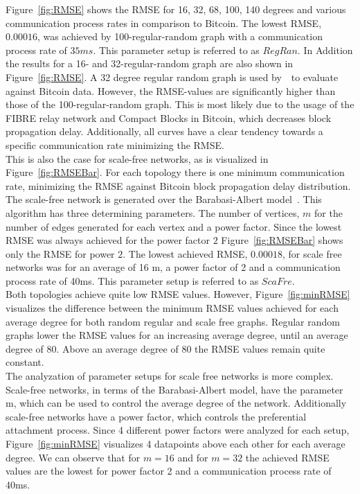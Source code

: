 Figure~\ref{fig:RMSE} shows the RMSE for 16, 32, 68, 100, 140 degrees and various communication process rates in comparison to Bitcoin. The lowest RMSE, $0.00016$, was achieved by 100-regular-random graph with a communication process rate of $35ms$. This parameter setup is referred to as $RegRan$. 
In Addition the results for a 16- and 32-regular-random graph are also shown in Figure~\ref{fig:RMSE}. A 32 degree regular random graph is used by~~to evaluate against Bitcoin data. However, the RMSE-values are significantly higher than those of the 100-regular-random graph. This is most likely due to the usage of the FIBRE relay network and Compact Blocks in Bitcoin, which decreases block propagation delay. Additionally, all curves have a clear tendency towards a specific communication rate minimizing the RMSE.\\
This is also the case for scale-free networks, as is visualized in Figure~\ref{fig:RMSEBar}. For each topology there is one minimum communication rate, minimizing the RMSE against Bitcoin block propagation delay distribution. The scale-free network is generated over the Barabasi-Albert model~\cite{BarabasiAlbert}. This algorithm has three determining parameters. The number of vertices, $m$ for the number of edges generated for each vertex and a power factor. Since the lowest RMSE was always achieved for the power factor $2$ Figure~\ref{fig:RMSEBar} shows only the RMSE for power $2$.
The lowest achieved RMSE, $0.00018$, for scale free networks was for an average of 16 m, a power factor of 2 and a communication process rate of 40ms. This parameter setup is referred to as $ScaFre$.\\
Both topologies achieve quite low RMSE values. However, Figure~\ref{fig:minRMSE} visualizes the difference between the minimum RMSE values achieved for each average degree for both random regular and scale free graphs.
Regular random graphs lower the RMSE values for an increasing average degree, until an average degree of 80. Above an average degree of 80 the RMSE values remain quite constant.\\
The analyzation of parameter setups for scale free networks is more complex. Scale-free networks, in terms of the Barabasi-Albert model, have the parameter m, which can be used to control the average degree of the network. Additionally scale-free networks have a power factor, which controls the preferential attachment process. Since 4 different power factors were analyzed for each setup, Figure~\ref{fig:minRMSE} visualizes 4 datapoints above each other for each average degree. We can observe that for $m=16$ and for $m=32$ the achieved RMSE values are the lowest for power factor 2 and a communication process rate of 40ms.\\
